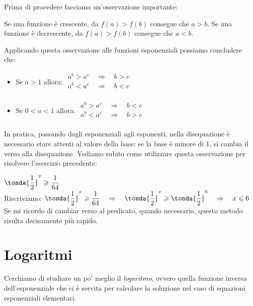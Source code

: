 Prima di procedere facciamo un'osservazione importante: 

\begin{osservazione}
Se una funzione è crescente, da \(f(a)>f(b)\) consegue che \(a>b\).
Se una funzione è decrescente, da \(f(a)>f(b)\) consegue che \(a<b\).
\end{osservazione}
Applicando questa osservazione alle funzioni esponenziali possiamo 
concludere che:

\begin{itemize}
 \item Se \(a>1\) allora: \quad \(\begin{matrix}
 a^b>a^c \quad \Rightarrow \quad b>c \\
 a^b<a^c \quad \Rightarrow \quad b<c \\
\end{matrix}\)
 \item Se \(0<a<1\) allora: \quad \(\begin{matrix}
 a^b>a^c \quad \Rightarrow \quad b<c \\
 a^b<a^c \quad \Rightarrow \quad b>c \\
\end{matrix}\)
\end{itemize}
In pratica, passando dagli esponenziali agli esponenti, nella disequazione 
è necessario stare attenti
al valore della base: se la base è minore di 1, si cambia il verso alla 
disequazione. 
Vediamo subito come utilizzare questa osservazione per risolvere 
l'esercizio precedente:


\begin{esempio}
 \(\tonda{\dfrac{1}{2}}^x \geqslant \dfrac{1}{64}\)\\[4pt]
 Riscriviamo:  \(\tonda{\dfrac{1}{2}}^x \geqslant \dfrac{1}{64} 
\quad\Rightarrow\quad
    \tonda{\dfrac{1}{2}}^x \geqslant \tonda{\dfrac{1}{2}}^6 
\quad\Rightarrow\quad 
    x \leqslant 6\)
\\[6pt]
Se mi ricordo di cambiar verso al predicato, quando necessario, questo 
metodo 
risulta decisamente più rapido.
\end{esempio}

\newpage %

\section{Logaritmi}
\label{sec:esplog_logaritmi}

Cerchiamo di studiare un po' meglio il \emph{logaritmo}, ovvero quella 
funzione inversa dell'esponenziale che ci è servita per calcolare la 
soluzione nel caso di equazioni esponenziali elementari.

